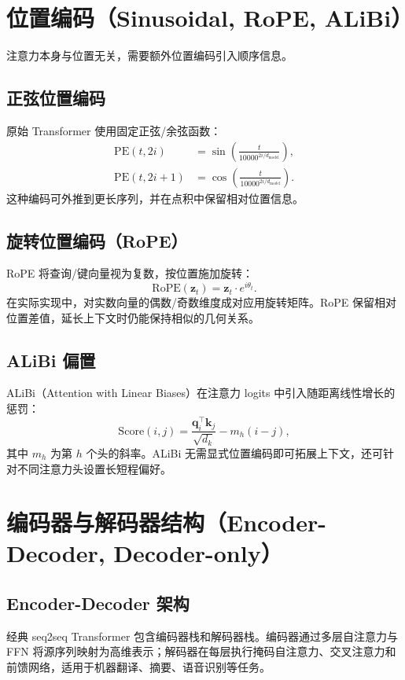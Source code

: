 \documentclass[UTF8,zihao=-4]{ctexart}
\begin{document}
\section{位置编码（Sinusoidal, RoPE, ALiBi）}
注意力本身与位置无关，需要额外位置编码引入顺序信息。

\subsection{正弦位置编码}
原始 Transformer 使用固定正弦/余弦函数：
\begin{align}
  \mathrm{PE}(t, 2i) &= \sin\left(\frac{t}{10000^{2i/d_{\text{model}}}}\right), \\
  \mathrm{PE}(t, 2i+1) &= \cos\left(\frac{t}{10000^{2i/d_{\text{model}}}}\right).
\end{align}
这种编码可外推到更长序列，并在点积中保留相对位置信息。

\subsection{旋转位置编码（RoPE）}
RoPE 将查询/键向量视为复数，按位置施加旋转：
\begin{equation}
  \mathrm{RoPE}(\mathbf{z}_t) = \mathbf{z}_t \cdot e^{i \theta_t}.
\end{equation}
在实际实现中，对实数向量的偶数/奇数维度成对应用旋转矩阵。RoPE 保留相对位置差值，延长上下文时仍能保持相似的几何关系。

\subsection{ALiBi 偏置}
ALiBi（Attention with Linear Biases）在注意力 logits 中引入随距离线性增长的惩罚：
\begin{equation}
  \mathrm{Score}(i, j) = \frac{\mathbf{q}_i^\top \mathbf{k}_j}{\sqrt{d_k}} - m_h (i - j),
\end{equation}
其中 $m_h$ 为第 $h$ 个头的斜率。ALiBi 无需显式位置编码即可拓展上下文，还可针对不同注意力头设置长短程偏好。

\section{编码器与解码器结构（Encoder-Decoder, Decoder-only）}
\subsection{Encoder-Decoder 架构}
经典 seq2seq Transformer 包含编码器栈和解码器栈。编码器通过多层自注意力与 FFN 将源序列映射为高维表示；解码器在每层执行掩码自注意力、交叉注意力和前馈网络，适用于机器翻译、摘要、语音识别等任务。
\end{document}
